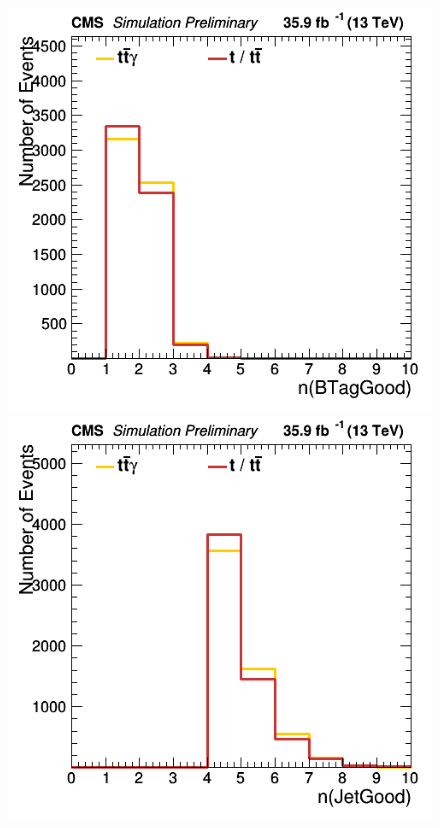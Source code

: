 \documentclass[11pt]{scrartcl}
\begin{document}
	\begin{figure}[H]
	\centering
	\begin{minipage}{.5\textwidth}
	  \centering
	  \includegraphics[width=0.70\linewidth]{figures/Select1/nBTagGood.png}
	\end{minipage}%
	\begin{minipage}{.5\textwidth}
	  \centering
	  \includegraphics[width=0.70\linewidth]{figures/Select1/nJetGood.png}
	\end{minipage}
	\label{fig:nBTagGood}
	\end{figure}
	
\end{document}
